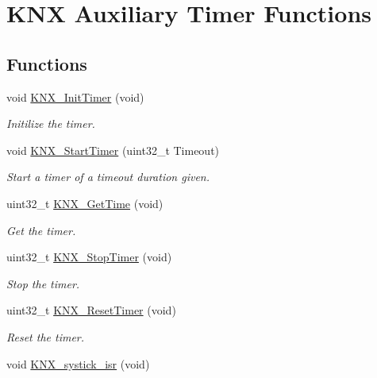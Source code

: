 \hypertarget{group___k_n_x___aux___exported___functions___group2}{}\section{K\+NX Auxiliary Timer Functions}
\label{group___k_n_x___aux___exported___functions___group2}
\subsection*{Functions}
\begin{DoxyCompactItemize}
\item 
void \hyperlink{group___k_n_x___aux___exported___functions___group2_ga21f8fee0433331a8a98b552d934d7fa9}{K\+N\+X\+\_\+\+Init\+Timer} (void)\hypertarget{group___k_n_x___aux___exported___functions___group2_ga21f8fee0433331a8a98b552d934d7fa9}{}\label{group___k_n_x___aux___exported___functions___group2_ga21f8fee0433331a8a98b552d934d7fa9}

\begin{DoxyCompactList}\small\item\em Initilize the timer. \end{DoxyCompactList}\item 
void \hyperlink{group___k_n_x___aux___exported___functions___group2_ga2d2be4d767e87be2cfab3a33c051c9b8}{K\+N\+X\+\_\+\+Start\+Timer} (uint32\+\_\+t Timeout)
\begin{DoxyCompactList}\small\item\em Start a timer of a timeout duration given. \end{DoxyCompactList}\item 
uint32\+\_\+t \hyperlink{group___k_n_x___aux___exported___functions___group2_gab95ee459c86b8b8a0045ab24d45d617b}{K\+N\+X\+\_\+\+Get\+Time} (void)
\begin{DoxyCompactList}\small\item\em Get the timer. \end{DoxyCompactList}\item 
uint32\+\_\+t \hyperlink{group___k_n_x___aux___exported___functions___group2_ga44b5f88a0f2b0590924627b428107e97}{K\+N\+X\+\_\+\+Stop\+Timer} (void)
\begin{DoxyCompactList}\small\item\em Stop the timer. \end{DoxyCompactList}\item 
uint32\+\_\+t \hyperlink{group___k_n_x___aux___exported___functions___group2_ga4a1fd53320eeed9eb08d09ec720f3d42}{K\+N\+X\+\_\+\+Reset\+Timer} (void)
\begin{DoxyCompactList}\small\item\em Reset the timer. \end{DoxyCompactList}\item 
void \hyperlink{group___k_n_x___aux___exported___functions___group2_gad9635bb60f2ba98f58874ef46e65c36d}{K\+N\+X\+\_\+systick\+\_\+isr} (void)\hypertarget{group___k_n_x___aux___exported___functions___group2_gad9635bb60f2ba98f58874ef46e65c36d}{}\label{group___k_n_x___aux___exported___functions___group2_gad9635bb60f2ba98f58874ef46e65c36d}


\end{DoxyCompactItemize}
